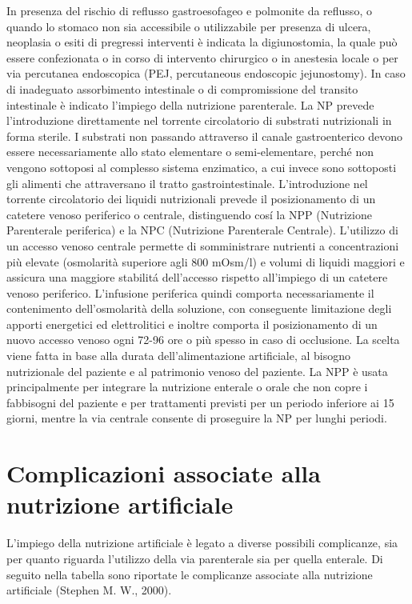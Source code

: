 \documentclass[11pt,a4paper,oneside]{book}
\begin{document}
In presenza del rischio di reflusso gastroesofageo e polmonite da reflusso, o quando lo stomaco non sia accessibile o utilizzabile per presenza di ulcera, neoplasia o esiti di pregressi interventi \`e indicata la digiunostomia, la quale pu\`o essere confezionata o in corso di intervento chirurgico o in anestesia locale o per via percutanea endoscopica (PEJ, percutaneous endoscopic jejunostomy). 
In caso di inadeguato assorbimento intestinale o di compromissione del transito intestinale \`e indicato l'impiego della nutrizione parenterale. La NP prevede l'introduzione direttamente nel torrente circolatorio di substrati nutrizionali in forma sterile. I substrati non passando attraverso il canale gastroenterico devono essere necessariamente allo stato elementare o semi-elementare, perché non vengono sottoposi al complesso sistema enzimatico, a cui invece sono sottoposti gli alimenti che attraversano il tratto gastrointestinale. L'introduzione nel torrente circolatorio dei liquidi nutrizionali prevede il posizionamento di un catetere venoso periferico o centrale, distinguendo cos\'i la NPP (Nutrizione Parenterale periferica) e la NPC (Nutrizione Parenterale Centrale).
L'utilizzo di un accesso venoso centrale permette di somministrare nutrienti a concentrazioni pi\`u elevate (osmolarit\`a superiore agli 800 mOsm/l) e volumi di liquidi maggiori e assicura una maggiore stabilit\'a dell'accesso rispetto all'impiego di un catetere venoso periferico. L'infusione periferica quindi comporta necessariamente il contenimento dell'osmolarit\`a della soluzione, con conseguente limitazione degli apporti energetici ed elettrolitici e inoltre comporta il posizionamento di un nuovo accesso venoso ogni 72-96 ore o pi\`u spesso in caso di occlusione. 
La scelta viene fatta in base alla durata dell'alimentazione artificiale, al bisogno nutrizionale del paziente e al patrimonio venoso del paziente. La NPP \`e usata principalmente per integrare la nutrizione enterale o orale che non copre i fabbisogni del paziente e per trattamenti previsti per un periodo inferiore ai 15 giorni, mentre la via centrale consente di proseguire la NP per lunghi periodi. 


\section{Complicazioni associate alla nutrizione artificiale}

L'impiego della nutrizione artificiale \`e legato a diverse possibili complicanze, sia per quanto riguarda l'utilizzo della via parenterale sia per quella enterale. 
Di seguito nella tabella sono riportate le complicanze associate alla nutrizione artificiale (Stephen M. W., 2000).
\end{document}
